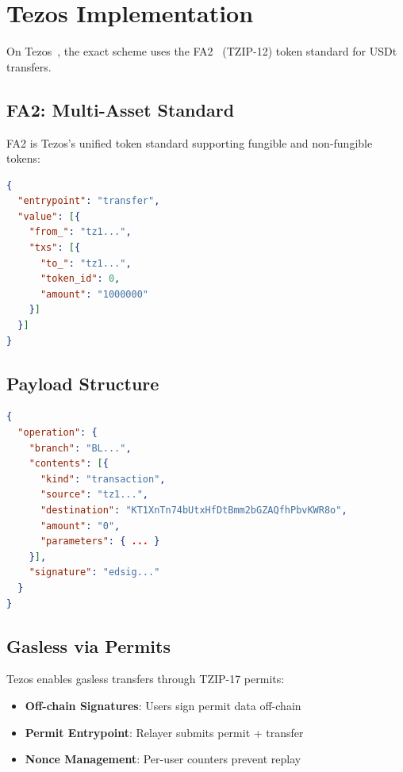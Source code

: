 \section{Tezos Implementation}
\label{sec:tezos-implementation}

On Tezos~\cite{tezos}, the exact scheme uses the FA2~\cite{fa2} (TZIP-12) token standard for USDt transfers.

\subsection{FA2: Multi-Asset Standard}

FA2 is Tezos's unified token standard supporting fungible and non-fungible tokens:

\begin{lstlisting}[language=json,caption={FA2 transfer entrypoint}]
{
  "entrypoint": "transfer",
  "value": [{
    "from_": "tz1...",
    "txs": [{
      "to_": "tz1...",
      "token_id": 0,
      "amount": "1000000"
    }]
  }]
}
\end{lstlisting}

\subsection{Payload Structure}

\begin{lstlisting}[language=json,caption={Tezos exact scheme payload}]
{
  "operation": {
    "branch": "BL...",
    "contents": [{
      "kind": "transaction",
      "source": "tz1...",
      "destination": "KT1XnTn74bUtxHfDtBmm2bGZAQfhPbvKWR8o",
      "amount": "0",
      "parameters": { ... }
    }],
    "signature": "edsig..."
  }
}
\end{lstlisting}

\subsection{Gasless via Permits}

Tezos enables gasless transfers through TZIP-17 permits:

\begin{itemize}
    \item \textbf{Off-chain Signatures}: Users sign permit data off-chain
    \item \textbf{Permit Entrypoint}: Relayer submits permit + transfer
    \item \textbf{Nonce Management}: Per-user counters prevent replay
\end{itemize}

